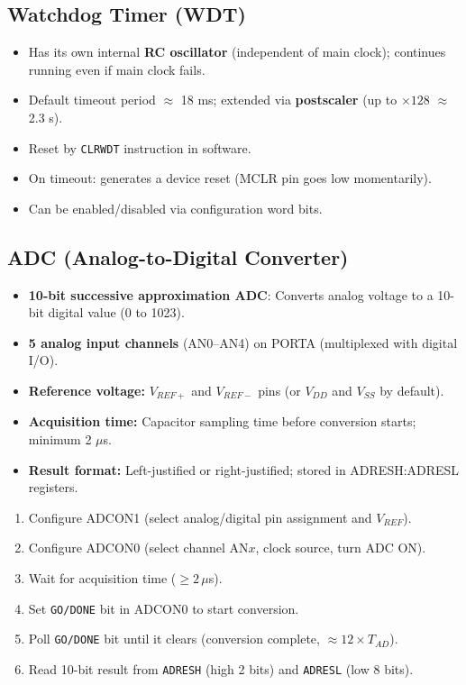 \documentclass[12pt,a4paper]{article}
\begin{document}
\subsection{Watchdog Timer (WDT)}
\begin{itemize}[leftmargin=*, itemsep=3pt]
  \item Has its own internal \textbf{RC oscillator} (independent of main clock); continues running even if main clock fails.
  \item Default timeout period $\approx$ 18 ms; extended via \textbf{postscaler} (up to $\times 128$ $\approx$ 2.3 s).
  \item Reset by \texttt{CLRWDT} instruction in software.
  \item On timeout: generates a device reset (MCLR pin goes low momentarily).
  \item Can be enabled/disabled via configuration word bits.
\end{itemize}

\subsection{ADC (Analog-to-Digital Converter)}
\begin{itemize}[leftmargin=*, itemsep=3pt]
  \item \textbf{10-bit successive approximation ADC}: Converts analog voltage to a 10-bit digital value (0 to 1023).
  \item \textbf{5 analog input channels} (AN0--AN4) on PORTA (multiplexed with digital I/O).
  \item \textbf{Reference voltage:} $V_{REF+}$ and $V_{REF-}$ pins (or $V_{DD}$ and $V_{SS}$ by default).
  \item \textbf{Acquisition time:} Capacitor sampling time before conversion starts; minimum 2 $\mu$s.
  \item \textbf{Result format:} Left-justified or right-justified; stored in ADRESH:ADRESL registers.
\end{itemize}

\begin{tcolorbox}[examplebox, title={\textbf{PIC16F873 ADC --- Conversion Steps}}]
\begin{enumerate}[topsep=0pt, leftmargin=*, itemsep=2pt]
  \item Configure ADCON1 (select analog/digital pin assignment and $V_{REF}$).
  \item Configure ADCON0 (select channel AN$x$, clock source, turn ADC ON).
  \item Wait for acquisition time ($\geq 2\,\mu$s).
  \item Set \texttt{GO/DONE} bit in ADCON0 to start conversion.
  \item Poll \texttt{GO/DONE} bit until it clears (conversion complete, $\approx 12 \times T_{AD}$).
  \item Read 10-bit result from \texttt{ADRESH} (high 2 bits) and \texttt{ADRESL} (low 8 bits).
\end{enumerate}
\end{tcolorbox}
\end{document}
